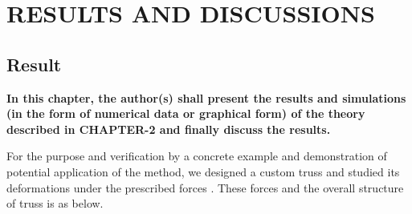 
\chapter{RESULTS AND DISCUSSIONS}

\section{{\bf{Result}}}
{\bf\color{red}In this chapter, the author(s) shall present the results and simulations (in the form of numerical data or graphical form) of the theory described in CHAPTER-2 and finally discuss the results.
}

For the purpose and verification by a concrete example and demonstration of potential application of the method, we designed a custom truss and studied its deformations under the prescribed forces . These forces and the overall structure of truss is as below.






